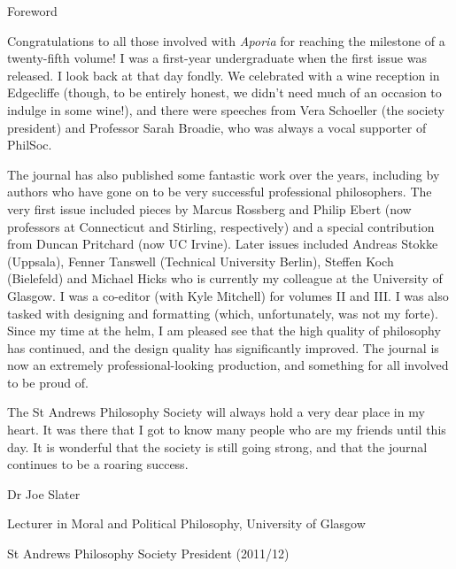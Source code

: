 \vspace*{\credgap}
{\noindent\LARGE\sc Foreword}
\vspace{\credgap}

\vspace{\ackgap}\noindent
Congratulations to all those involved with \emph{Aporia} for reaching
the milestone of a twenty-fifth volume! I was a first-year undergraduate
when the first issue was released. I look back at that day fondly. We
celebrated with a wine reception in Edgecliffe (though, to be entirely
honest, we didn't need much of an occasion to indulge in some wine!),
and there were speeches from Vera Schoeller (the society president) and
Professor Sarah Broadie, who was always a vocal supporter of PhilSoc.

The journal has also published some fantastic work over the years,
including by authors who have gone on to be very successful professional
philosophers. The very first issue included pieces by Marcus Rossberg
and Philip Ebert (now professors at Connecticut and Stirling,
respectively) and a special contribution from Duncan Pritchard (now UC
Irvine). Later issues included Andreas Stokke (Uppsala), Fenner Tanswell
(Technical University Berlin), Steffen Koch (Bielefeld) and Michael
Hicks who is currently my colleague at the University of Glasgow. I was
a co-editor (with Kyle Mitchell) for volumes II and III. I was also
tasked with designing and formatting (which, unfortunately, was not my
forte). Since my time at the helm, I am pleased see that the high
quality of philosophy has continued, and the design quality has
significantly improved. The journal is now an extremely
professional-looking production, and something for all involved to be
proud of.

The St Andrews Philosophy Society will always hold a very dear place in
my heart. It was there that I got to know many people who are my friends
until this day. It is wonderful that the society is still going strong,
and that the journal continues to be a roaring success.

\vspace{\ackgap}\noindent
Dr Joe Slater

\noindent
Lecturer in Moral and Political Philosophy, University of Glasgow

\noindent
St Andrews Philosophy Society President (2011/12)
